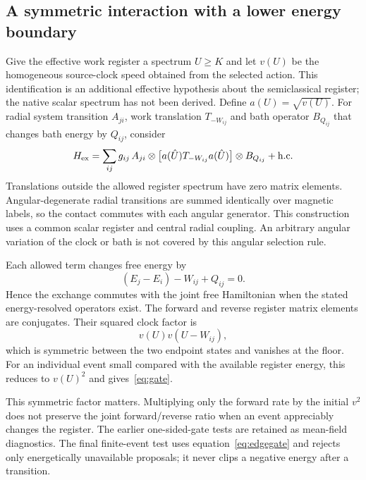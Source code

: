 \documentclass[11pt]{article}
\begin{document}
\subsection{A symmetric interaction with a lower energy boundary}
Give the effective work register a spectrum $U\ge K$ and let $v(U)$ be
the homogeneous source-clock speed obtained from the selected action.
This identification is an additional effective hypothesis about the
semiclassical register; the native scalar spectrum has not been derived.
Define $a(U)=\sqrt{v(U)}$. For radial system transition $A_{ji}$, work
translation $T_{-W_{ij}}$ and bath operator $B_{Q_{ij}}$ that changes bath
energy by $Q_{ij}$, consider
\begin{equation}\label{eq:Hint}
 H_{\rm ex}=\sum_{ij}g_{ij}\,
 A_{ji}\otimes\bigl[a(\hat U)T_{-W_{ij}}a(\hat U)\bigr]
 \otimes B_{Q_{ij}}+\text{h.c.}
\end{equation}
Translations outside the allowed register spectrum have zero matrix
elements. Angular-degenerate radial transitions are summed identically
over magnetic labels, so the contact commutes with each angular generator.
This construction uses a common scalar register and central radial coupling.
An arbitrary angular variation of the clock or bath is not covered by this
angular selection rule.

Each allowed term changes free energy by
\begin{equation}
 (E_j-E_i)-W_{ij}+Q_{ij}=0.
\end{equation}
Hence the exchange commutes with the joint free Hamiltonian when the stated
energy-resolved operators exist. The forward and reverse register matrix
elements are conjugates. Their squared clock factor is
\begin{equation}\label{eq:edgegate}
 v(U)v(U-W_{ij}),
\end{equation}
which is symmetric between the two endpoint states and vanishes at the
floor. For an individual event small compared with the available register
energy, this reduces to $v(U)^2$ and gives~\eqref{eq:gate}.

This symmetric factor matters. Multiplying only the forward rate by the
initial $v^2$ does not preserve the joint forward/reverse ratio when an
event appreciably changes the register. The earlier one-sided-gate tests
are retained as mean-field diagnostics. The final finite-event test uses
equation~\eqref{eq:edgegate} and rejects only energetically unavailable
proposals; it never clips a negative energy after a transition.
\end{document}
